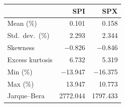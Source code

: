 \begin{tabular}{lrr}
\toprule
 & SPI & SPX \\
\midrule
Mean (\%) & 0.101 & 0.158 \\
Std.\ dev.\ (\%) & 2.293 & 2.344 \\
Skewness & $-$0.826 & $-$0.846 \\
Excess kurtosis & 6.732 & 5.319 \\
Min (\%) & $-$13.947 & $-$16.375 \\
Max (\%) & 13.947 & 10.773 \\
Jarque--Bera & 2772.044 & 1797.433 \\
\bottomrule
\end{tabular}
